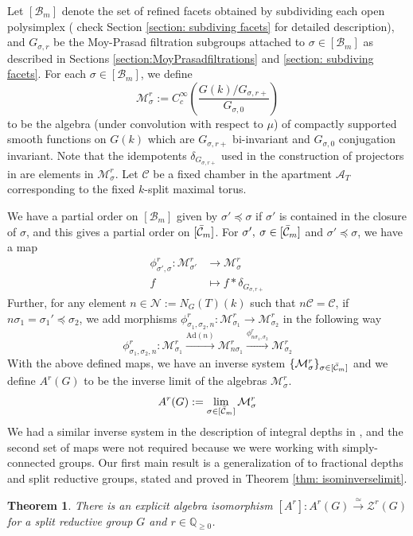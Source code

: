 \documentclass[11 pt]{article}
\numberwithin{equation}{subsection}
\newtheorem{theorem}{Theorem}[section]
\theoremstyle{definition}
\theoremstyle{remark}
\theoremstyle{conjecture}
\newcommand{\Ad}{\mathrm{Ad}}
\newcommand{\Q}{\mathbb Q}
\newcommand{\A}{\mathcal A}
\newcommand{\M}{\mathcal{M}}
\newcommand{\B}{\mathcal{B}}
\newcommand{\ZZ}{\mathcal{Z}}
\newcommand{\mc}{\mathcal}
\newcommand{\mcC}{\mathcal C}
\begin{document}
Let $[\B_m]$ denote the set of refined facets obtained by subdividing each open polysimplex ( check Section \ref{section: subdiving facets} for detailed description), and $G_{\sigma,r} $ be the Moy-Prasad filtration subgroups attached to $\sigma \in [\B_m]$ as described in Sections \ref{section:MoyPrasadfiltrations} and \ref{section: subdiving facets}. For each $\sigma \in [\B_m]$, we define 
\[
\M_\sigma^r:=C_c^\infty\left(\frac{G(k)/G_{\sigma,r+}}{G_{\sigma,0}}\right)
\]
to be the algebra (under convolution with respect to $\mu$) of compactly supported smooth functions on $G(k)$ which are $G_{\sigma,r+}$ bi-invariant and ${G_{\sigma,0}}$ conjugation invariant. Note that the idempotents $\delta_{G_{\sigma,r+}}$ used in the construction of projectors in \cite{BKV2} are elements in $\M_\sigma^r$. Let $\mcC$ be a fixed chamber in the apartment $\A_T$ corresponding to the fixed $k$-split maximal torus. \par
We have a partial order on $[\B_m]$ given by $\sigma' \preceq \sigma $ if $\sigma'$ is contained in the closure of $\sigma$, and this gives a partial order on $[\Bar{\mcC}_m]$. For $\sigma',\:\sigma\in [\Bar{\mcC}_m] $ and $\sigma' \preceq \sigma $, we have a map 
\begin{align*}
\phi^r_{\sigma',\sigma}:\M^r_{\sigma'} &\longrightarrow \M^r_{\sigma}\\
f &\longmapsto f*\delta_{G_{\sigma , r+}}  
\end{align*}
Further, for any element $n\in \mc N:=N_G(T)(k)$ such that $n\mcC=\mcC$, if $n\sigma_1=\sigma_1'\preceq \sigma_2$, we add morphisms $\phi^r_{\sigma_1,\sigma_2,n}:\M^r_{\sigma_1} \longrightarrow \M^r_{\sigma_2}$ in the following way
\[
\phi^r_{\sigma_1,\sigma_2,n}:\M^r_{\sigma_1} \xrightarrow[]{\Ad(n)} \M^r_{n\sigma_1}\xrightarrow[]{\phi^r_{n\sigma_1,\sigma_2}}\M^r_{\sigma_2} 
\]
With the above defined maps, we have an inverse system $\{\M^r_{\sigma}\}_{\sigma\in [\Bar{\mcC}_m] }$ and we define $A^r(G)$ to be the inverse limit of the algebras $\M^r_{\sigma}$.
$$ A^r(G) := \lim_{\sigma\in [\Bar{\mcC}_m] } \M^r_{\sigma}$$
We had a similar inverse system in the description of integral depths in \cite{cb24}, and the second set of maps were not required because we were working with simply-connected groups. Our first main result is a  generalization of \cite[Theorem 1.1]{cb24} to fractional depths and split reductive groups, stated and proved in Theorem \ref{thm: isominverselimit}.
\begin{theorem}
    There is an explicit algebra isomorphism $[A^r]: A^r(G) \xrightarrow{\simeq} \ZZ^r(G)$ for a split reductive group $G$ and $r \in \Q_{\geq 0}$.
\end{theorem}
\end{document}
